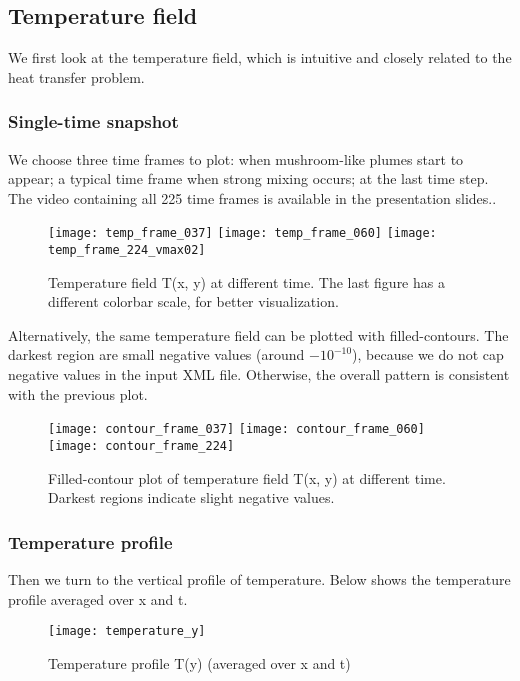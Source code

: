 \graphicspath{ {./zhuangjw/img/} }

\subsection{Temperature field}

We first look at the temperature field, which is intuitive and closely related to the heat transfer problem.

\subsubsection{Single-time snapshot}

We choose three time frames to plot: when mushroom-like plumes start to appear; a typical time frame when strong mixing occurs; at the last time step. The video containing all 225 time frames is available in the presentation slides..

\begin{figure}[H]
\texttt{[image: temp\_frame\_037]}
\texttt{[image: temp\_frame\_060]}
\texttt{[image: temp\_frame\_224\_vmax02]}
\centering
\caption{Temperature field T(x, y) at different time. The last figure has a different colorbar scale, for better visualization.}
\end{figure}

Alternatively, the same temperature field can be plotted with filled-contours. The darkest region are small negative values (around $-10^{-10}$), because we do not cap negative values in the input XML file. Otherwise, the overall pattern is consistent with the previous plot.

\begin{figure}[H]
\texttt{[image: contour\_frame\_037]}
\texttt{[image: contour\_frame\_060]}
\texttt{[image: contour\_frame\_224]}
\centering
\caption{Filled-contour plot of temperature field T(x, y) at different time. Darkest regions indicate slight negative values.}
\end{figure}

\subsubsection{Temperature profile}

Then we turn to the vertical profile of temperature. Below shows the temperature profile averaged over x and t.

\begin{figure}[H]
\texttt{[image: temperature\_y]}
\centering
\caption{Temperature profile T(y) (averaged over x and t)}
\end{figure}

